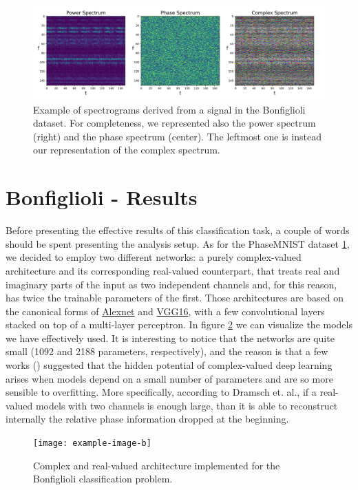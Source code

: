 \documentclass[../main.tex]{subfiles}
\begin{document}
\begin{figure}[ht]
	\centering
	\includegraphics[width=\textwidth]{pictures/example_bonfiglioli_spectrum}
	\caption{Example of spectrograms derived from a signal in the Bonfiglioli dataset. For completeness, we represented also the power spectrum (right) and the phase spectrum (center). The leftmost one is instead our representation of the complex spectrum.}
	\label{fig:example_bonfiglioli_spectrum}
\end{figure}


\section{Bonfiglioli - Results}

Before presenting the effective results of this classification task, a couple of words should be spent presenting the analysis setup. As for the PhaseMNIST dataset \ref{}, we decided to employ two different networks: a purely complex-valued architecture and its corresponding real-valued counterpart, that treats real and imaginary parts of the input as two independent channels and, for this reason, has twice the trainable parameters of the first. Those architectures are based on the canonical forms of \href{https://en.wikipedia.org/wiki/AlexNet}{Alexnet} and \href{https://medium.com/@mygreatlearning/what-is-vgg16-introduction-to-vgg16-f2d63849f615}{VGG16}, with a few convolutional layers stacked on top of a multi-layer perceptron. In figure \ref{fig:bonfiglioli_architectures} we can visualize the models we have effectively used. It is interesting to notice that the networks are quite small (1092 and 2188 parameters, respectively), and the reason is that a few works (\cite{Dramsch_seismic}) suggested that the hidden potential of complex-valued deep learning arises when models depend on a small number of parameters and are so more sensible to overfitting. More specifically, according to Dramsch et. al., if a real-valued models with two channels is enough large, than it is able to reconstruct internally the relative phase information dropped at the beginning.
\begin{figure}[!ht]
	\centering
	\texttt{[image: example-image-b]}
	\caption{Complex and real-valued architecture implemented for the Bonfiglioli classification problem.}
	\label{fig:bonfiglioli_architectures}
\end{figure}
\end{document}
